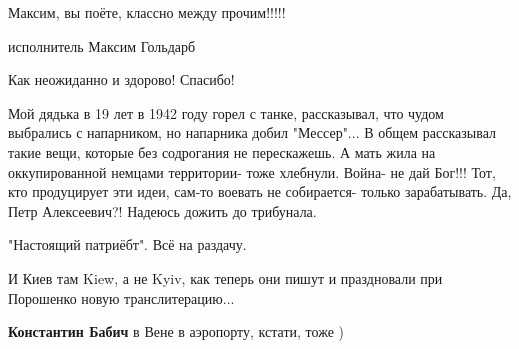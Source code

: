 \begin{itemize}
\begin{multicols}{2}
Максим, вы поёте, классно между прочим!!!!!

исполнитель Максим Гольдарб

Как неожиданно и здорово! Спасибо!


Мой дядька в 19 лет в 1942 году горел с танке, рассказывал, что чудом выбрались
с напарником, но напарника добил "Мессер"... В общем рассказывал такие вещи,
которые без содрогания не перескажешь. А мать жила на оккупированной немцами
территории- тоже хлебнули.  Война- не дай Бог!!! Тот, кто продуцирует эти идеи,
сам-то воевать не собирается- только зарабатывать. Да, Петр Алексеевич?!
Надеюсь дожить до трибунала.

\end{multicols}

"Настоящий патриёбт". Всё на раздачу.

И Киев там Kiew, а не Kyiv, как теперь они пишут и праздновали при Порошенко новую транслитерацию...

\textbf{Константин Бабич} в Вене в аэропорту, кстати, тоже )

\end{itemize} %
